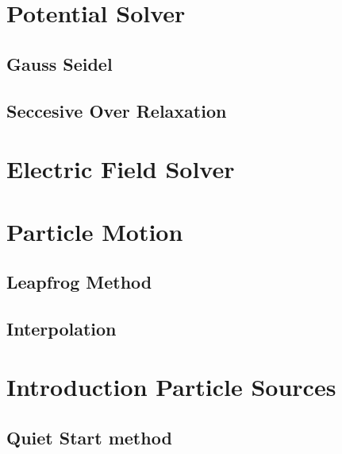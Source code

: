 \section{Potential Solver}

\subsection{Gauss Seidel}

\subsection{Seccesive Over Relaxation}

\section{Electric Field Solver}

\section{Particle Motion}

\subsection{Leapfrog Method}

\subsection{Interpolation}

\section{Introduction Particle Sources}

\subsection{Quiet Start method}

